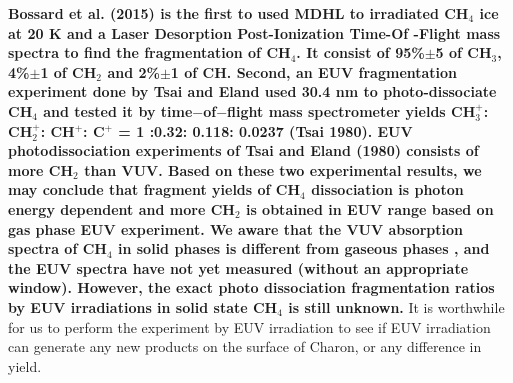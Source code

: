 \textbf{Bossard et al. (2015) \cite{bossard2015methane} is the first to used MDHL to irradiated CH$_4$ ice at 20 K and a Laser Desorption Post-Ionization Time-Of -Flight mass spectra to find the fragmentation of CH$_4$. It consist of 95\%$\pm$5 of CH$_3$, 4\%$\pm$1 of CH$_2$ and 2\%$\pm$1 of CH. Second, an EUV fragmentation experiment done by Tsai and Eland \cite{tsai1980mass} used 30.4 nm to photo-dissociate CH$_4$ and tested it by time$-$of$-$flight mass spectrometer yields CH$_3^+$: CH$_2^+$: CH$^+$: C$^+$ = 1 :0.32: 0.118: 0.0237 (Tsai 1980). EUV photodissociation experiments of Tsai and Eland (1980)\cite{tsai1980mass} consists of more CH$_2$ than VUV. Based on these two experimental results, we may conclude that fragment yields of CH$_4$ dissociation is photon energy dependent and more CH$_2$ is obtained in EUV range based on gas phase EUV experiment. We aware that the VUV absorption spectra of CH$_4$ in solid phases is different from gaseous phases \cite{cruz2014nonpolar}, and the EUV spectra have not yet measured (without an appropriate window). However, the exact photo dissociation fragmentation ratios by EUV irradiations in solid state CH$_4$ is still unknown.} It is worthwhile for us to perform the experiment by EUV irradiation to see if EUV irradiation can generate any new products on the surface of Charon, or any difference in yield.\\

